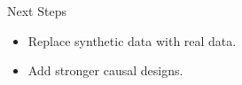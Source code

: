 \begin{frame}{Next Steps}
\begin{itemize}
\item Replace synthetic data with real data.
\item Add stronger causal designs.
\end{itemize}
\end{frame}
